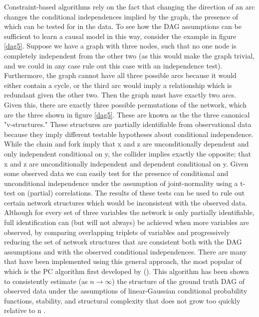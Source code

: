 \documentclass{article}
\begin{document}
Constraint-based algorithms rely on the fact that changing the direction of an arc changes the conditional independences implied by the graph, the presence of which can be tested for in the data. To see how the DAG assumptions can be sufficient to learn a causal model in this way, consider the example in figure \ref{dag5}. Suppose we have a graph with three nodes, such that no one node is completely independent from the other two (as this would make the graph trivial, and we could in any case rule out this case with an independence test). Furthermore, the graph cannot have all three possible arcs because it would either contain a cycle, or the third arc would imply a relationship which is redundant given the other two. Then the graph must have exactly two arcs. Given this, there are exactly three possible permutations of the network, which are the three shown in figure \ref{dag5}. These are known as the the three canonical "v-structures." \parencite{pearl2014probabilistic} These structures are partially identifiable from observational data because they imply different testable hypotheses about conditional independence. While the chain and fork imply that x and z are unconditionally dependent and only independent conditional on y, the collider implies exactly the opposite; that x and z are unconditionally independent and dependent conditional on y. Given some observed data we can easily test for the presence of conditional and unconditional independence under the assumption of joint-normality using a t-test on (partial) correlations. The results of these tests can be used to rule out certain network structures which would be inconsistent with the observed data. Although for every set of three variables the network is only partially identifiable, full identification can (but will not always) be achieved when more variables are observed, by comparing overlapping triplets of variables and progressively reducing the set of network structures that are consistent both with the DAG assumptions and with the observed conditional independences. There are many that have been implemented using this general approach, the most popular of which is the PC algorithm first developed by \citeauthor{spirtes2000causation} (\citeyear{spirtes2000causation}). This algorithm has been shown to consistently estimate (as $n \rightarrow \infty$) the structure of the ground truth DAG of observed data under the assumptions of linear-Gaussian conditional probability functions, stability, and structural complexity that does not grow too quickly relative to n \parencite{kalisch2007estimating}. 
\end{document}
